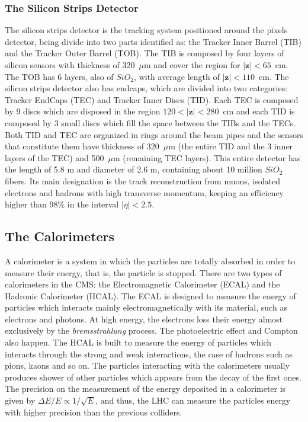 \subsubsection{The Silicon Strips Detector}
The silicon strips detector is the tracking system positioned around the pixels detector, being divide into two parts identified as: the Tracker Inner Barrel (TIB) and the Tracker Outer Barrel (TOB). The TIB is composed by four layers of silicon sensors with thickness of 320~$\mu$m and cover the region for $|\textbf{z}| < 65$~cm. The TOB has 6 layers, also of $SiO_2$, with average length of $|\textbf{z}| < 110$~cm. The silicon strips detector also has endcaps, which are divided into two categories: Tracker EndCaps (TEC) and Tracker Inner Discs (TID). Each TEC is composed by 9 discs which are disposed in the region $120 < |\textbf{z}| < 280$~cm and each TID is composed by 3 small discs which fill the space between the TIBs and the TECs. Both TID and TEC are organized in rings around the beam pipes and the sensors that constitute them have thickness of 320~$\mu$m (the entire TID and the 3 inner layers of the TEC) and 500~$\mu$m (remaining TEC layers). This entire detector has the length of 5.8 m and diameter of 2.6 m, containing about 10 million $SiO_{2}$ fibers. Its main designation is the track reconstruction from muons, isolated electrons and hadrons with high transverse momentum, keeping an efficiency higher than 98$\%$ in the interval $|\eta| < 2.5$.

\subsection{The Calorimeters}
A calorimeter is a system in which the particles are totally absorbed in order to measure their energy, that is, the particle is stopped. There are two types of calorimeters in the CMS: the Electromagnetic Calorimeter (ECAL) and the Hadronic Calorimeter (HCAL). The ECAL is designed to measure the energy of particles which interacts mainly electromagnetically with its material, such as electrons and photons. At high energy, the electrons loss their energy almost exclusively by the \textit{bremsstrahlung} process. The photoelectric effect and Compton also happen. The HCAL is built to measure the energy of particles which interacts through the strong and weak interactions, the case of hadrons such as pions, kaons and so on. The particles interacting with the calorimeters usually produces shower of other particles which appears from the decay of the first ones. The precision on the measurement of the energy deposited in a calorimeter is given by $\Delta E/E \propto 1/ \sqrt{E}$, and thus, the LHC can measure the particles energy with higher precision than the previous colliders.

